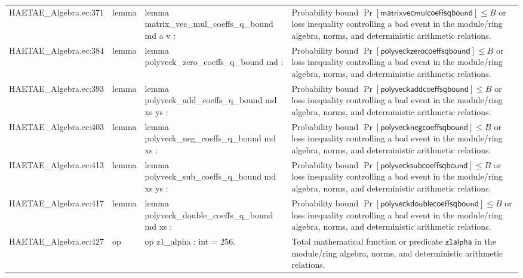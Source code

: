\documentclass[10pt]{article}
\begin{document}
\begin{longtable}{L{0.11\textwidth}L{0.055\textwidth}L{0.385\textwidth}L{0.41\textwidth}}
HAETAE\_\allowbreak{}Algebra.\allowbreak{}ec:\allowbreak{}371 & lemma & {\ttfamily\scriptsize lemma matrix\_\allowbreak{}vec\_\allowbreak{}mul\_\allowbreak{}coeffs\_\allowbreak{}q\_\allowbreak{}bound md a v :} & Probability bound $\Pr[\mathsf{matrixvecmulcoeffsqbound}]\le B$ or loss inequality controlling a bad event in the module/ring algebra, norms, and deterministic arithmetic relations. \\
HAETAE\_\allowbreak{}Algebra.\allowbreak{}ec:\allowbreak{}384 & lemma & {\ttfamily\scriptsize lemma polyveck\_\allowbreak{}zero\_\allowbreak{}coeffs\_\allowbreak{}q\_\allowbreak{}bound md :} & Probability bound $\Pr[\mathsf{polyveckzerocoeffsqbound}]\le B$ or loss inequality controlling a bad event in the module/ring algebra, norms, and deterministic arithmetic relations. \\
HAETAE\_\allowbreak{}Algebra.\allowbreak{}ec:\allowbreak{}393 & lemma & {\ttfamily\scriptsize lemma polyveck\_\allowbreak{}add\_\allowbreak{}coeffs\_\allowbreak{}q\_\allowbreak{}bound md xs ys :} & Probability bound $\Pr[\mathsf{polyveckaddcoeffsqbound}]\le B$ or loss inequality controlling a bad event in the module/ring algebra, norms, and deterministic arithmetic relations. \\
HAETAE\_\allowbreak{}Algebra.\allowbreak{}ec:\allowbreak{}403 & lemma & {\ttfamily\scriptsize lemma polyveck\_\allowbreak{}neg\_\allowbreak{}coeffs\_\allowbreak{}q\_\allowbreak{}bound md xs :} & Probability bound $\Pr[\mathsf{polyvecknegcoeffsqbound}]\le B$ or loss inequality controlling a bad event in the module/ring algebra, norms, and deterministic arithmetic relations. \\
HAETAE\_\allowbreak{}Algebra.\allowbreak{}ec:\allowbreak{}413 & lemma & {\ttfamily\scriptsize lemma polyveck\_\allowbreak{}sub\_\allowbreak{}coeffs\_\allowbreak{}q\_\allowbreak{}bound md xs ys :} & Probability bound $\Pr[\mathsf{polyvecksubcoeffsqbound}]\le B$ or loss inequality controlling a bad event in the module/ring algebra, norms, and deterministic arithmetic relations. \\
HAETAE\_\allowbreak{}Algebra.\allowbreak{}ec:\allowbreak{}417 & lemma & {\ttfamily\scriptsize lemma polyveck\_\allowbreak{}double\_\allowbreak{}coeffs\_\allowbreak{}q\_\allowbreak{}bound md xs :} & Probability bound $\Pr[\mathsf{polyveckdoublecoeffsqbound}]\le B$ or loss inequality controlling a bad event in the module/ring algebra, norms, and deterministic arithmetic relations. \\
HAETAE\_\allowbreak{}Algebra.\allowbreak{}ec:\allowbreak{}427 & op & {\ttfamily\scriptsize op z1\_\allowbreak{}alpha : int = 256.} & Total mathematical function or predicate $\mathsf{z1alpha}$ in the module/ring algebra, norms, and deterministic arithmetic relations. \\

\end{longtable}
\end{document}
